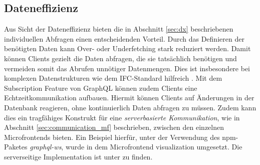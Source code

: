 \subsection{Dateneffizienz} \label{sec:de}
Aus Sicht der Dateneffizienz bieten die in Abschnitt \ref{sec:dx} beschriebenen individuellen Abfragen einen entscheidenden Vorteil. Durch das Definieren der benötigten Daten kann Over- oder Underfetching stark reduziert werden. Damit können Clients gezielt die Daten abfragen, die sie tatsächlich benötigen und vermeiden somit das Abrufen unnötiger Datenmengen. Dies ist insbesondere bei komplexen Datenstrukturen wie dem IFC-Standard hilfreich \cite{wolf:2025:ifc2graphql}.
Mit dem Subscription Feature von GraphQL \cite{graphql_subscriptions} können zudem Clients eine Echtzeitkommunikation aufbauen. Hiermit können Clients auf Änderungen in der Datenbank reagieren, ohne kontinuierlich Daten abfragen zu müssen. Zudem kann dies ein tragfähiges Konstrukt für eine \textit{serverbasierte Kommunikation}, wie in Abschnitt \ref{sec:communication_mf} beschrieben, zwischen den einzelnen Microfrontends bieten.
Ein Beispiel hierfür, unter der Verwendung des npm-Paketes \textit{graphql-ws}, wurde in dem Microfrontend visualization \cite[\texttt{building\_management/apps/visualization}]{eigener_code_usb} umgesetzt. Die serverseitige Implementation ist unter \cite[\texttt{building\_management/apps/server/prototype}]{eigener_code_usb} zu finden.